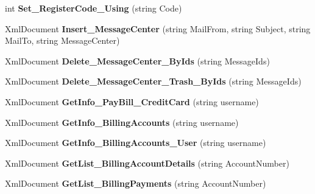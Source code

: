 \begin{DoxyCompactItemize}
\item 
\hypertarget{class_data_service_a91f53bd10b313175d3f651b21126b7ed}{int {\bfseries Set\-\_\-\-Register\-Code\-\_\-\-Using} (string Code)}\label{class_data_service_a91f53bd10b313175d3f651b21126b7ed}

\item 
\hypertarget{class_data_service_a27c7cbd088e31f6f3ede3946515e2a04}{Xml\-Document {\bfseries Insert\-\_\-\-Message\-Center} (string Mail\-From, string Subject, string Mail\-To, string Message\-Center)}\label{class_data_service_a27c7cbd088e31f6f3ede3946515e2a04}

\item 
\hypertarget{class_data_service_abd36617d72c34e8de2cc83d84ad81089}{Xml\-Document {\bfseries Delete\-\_\-\-Message\-Center\-\_\-\-By\-Ids} (string Message\-Ids)}\label{class_data_service_abd36617d72c34e8de2cc83d84ad81089}

\item 
\hypertarget{class_data_service_a715d6956951e3ec8d57688137b1110af}{Xml\-Document {\bfseries Delete\-\_\-\-Message\-Center\-\_\-\-Trash\-\_\-\-By\-Ids} (string Message\-Ids)}\label{class_data_service_a715d6956951e3ec8d57688137b1110af}

\item 
\hypertarget{class_data_service_a57a324d2ffcd220b3ecae8c6d79a6faf}{Xml\-Document {\bfseries Get\-Info\-\_\-\-Pay\-Bill\-\_\-\-Credit\-Card} (string username)}\label{class_data_service_a57a324d2ffcd220b3ecae8c6d79a6faf}

\item 
\hypertarget{class_data_service_a6c75eea9a18f8397d11f249d92176335}{Xml\-Document {\bfseries Get\-Info\-\_\-\-Billing\-Accounts} (string username)}\label{class_data_service_a6c75eea9a18f8397d11f249d92176335}

\item 
\hypertarget{class_data_service_a1d5027ccc0ec73f361207cfdddc952c8}{Xml\-Document {\bfseries Get\-Info\-\_\-\-Billing\-Accounts\-\_\-\-User} (string username)}\label{class_data_service_a1d5027ccc0ec73f361207cfdddc952c8}

\item 
\hypertarget{class_data_service_aba72984e816648a106c7fd0285952b51}{Xml\-Document {\bfseries Get\-List\-\_\-\-Billing\-Account\-Details} (string Account\-Number)}\label{class_data_service_aba72984e816648a106c7fd0285952b51}

\item 
\hypertarget{class_data_service_a2e68c5cc3fc4d870e34040f6f519397a}{Xml\-Document {\bfseries Get\-List\-\_\-\-Billing\-Payments} (string Account\-Number)}\label{class_data_service_a2e68c5cc3fc4d870e34040f6f519397a}


\end{DoxyCompactItemize}

